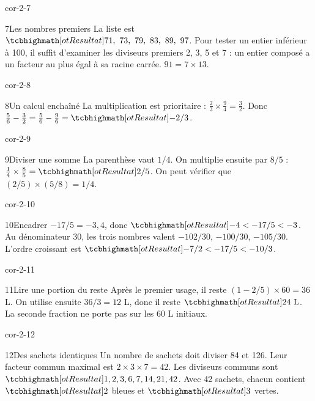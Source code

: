 \begin{blocLivre}{cor-2-7}\begin{corrige}{7}{Les nombres premiers}
La liste est $\res{71,\ 73,\ 79,\ 83,\ 89,\ 97}$. Pour tester un entier inférieur à 100, il suffit d’examiner les diviseurs premiers 2, 3, 5 et 7 : un entier composé a un facteur au plus égal à sa racine carrée. $91=7\times13$.
\end{corrige}\end{blocLivre}
\begin{blocLivre}{cor-2-8}\begin{corrige}{8}{Un calcul enchaîné}
La multiplication est prioritaire : $\frac23\times\frac94=\frac32$. Donc $\frac56-\frac32=\frac56-\frac96=\res{-2/3}$.
\end{corrige}\end{blocLivre}
\begin{blocLivre}{cor-2-9}\begin{corrige}{9}{Diviser une somme}
La parenthèse vaut $1/4$. On multiplie ensuite par $8/5$ : $\frac14\times\frac85=\res{2/5}$. On peut vérifier que $(2/5)\times(5/8)=1/4$.
\end{corrige}\end{blocLivre}
\begin{blocLivre}{cor-2-10}\begin{corrige}{10}{Encadrer}
$-17/5=-3{,}4$, donc $\res{-4<-17/5<-3}$. Au dénominateur 30, les trois nombres valent $-102/30$, $-100/30$, $-105/30$. L’ordre croissant est $\res{-7/2<-17/5<-10/3}$.
\end{corrige}\end{blocLivre}
\begin{blocLivre}{cor-2-11}\begin{corrige}{11}{Lire une portion du reste}
Après le premier usage, il reste $(1-2/5)\times60=36$ L. On utilise ensuite $36/3=12$ L, donc il reste $\res{24\ \mathrm L}$. La seconde fraction ne porte pas sur les 60 L initiaux.
\end{corrige}\end{blocLivre}
\begin{blocLivre}{cor-2-12}\begin{corrige}{12}{Des sachets identiques}
Un nombre de sachets doit diviser 84 et 126. Leur facteur commun maximal est $2\times3\times7=42$. Les diviseurs communs sont $\res{1,2,3,6,7,14,21,42}$. Avec 42 sachets, chacun contient $\res2$ bleues et $\res3$ vertes.
\end{corrige}\end{blocLivre}
